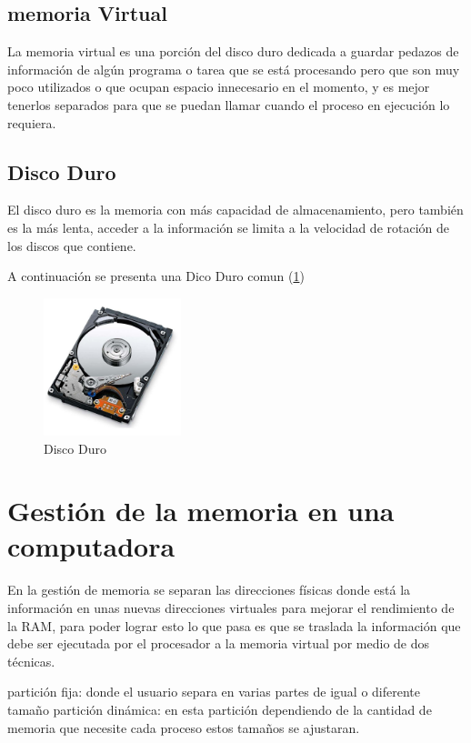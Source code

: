 \documentclass{article}
\begin{document}
\vspace{0.3cm}

\subsection{memoria Virtual}

La memoria virtual es una porción del disco duro dedicada a guardar pedazos de información de algún programa o tarea que se está procesando pero que son muy poco utilizados o que ocupan espacio innecesario en el momento, y es mejor tenerlos separados para que se puedan llamar cuando el proceso en ejecución lo requiera.

\vspace{0.3cm}

\subsection{Disco Duro}

El disco duro es la memoria con más capacidad de almacenamiento, pero también es la más lenta, acceder a la información se limita a la velocidad de rotación de los discos que contiene.

\vspace{0.6cm}

A continuación se presenta una Dico Duro comun (\ref{fig:discoduro})

\begin{figure}[h]
\includegraphics[width=4cm]{discoduro.png}
\centering
\caption{Disco Duro}
\label{fig:discoduro}
\end{figure}

\section{Gestión de la memoria en una computadora} 

En la gestión de memoria se separan las direcciones físicas donde está la información en unas nuevas direcciones virtuales para mejorar el rendimiento de la RAM, para poder lograr esto lo que pasa es que se traslada la información que debe ser ejecutada por el procesador a la memoria virtual por medio de dos técnicas.

partición fija: donde el usuario separa en varias partes de igual o diferente tamaño 
partición dinámica: en esta partición dependiendo de la cantidad de memoria que necesite cada proceso estos tamaños se ajustaran. 

\vspace{0.6cm}





\end{document}
